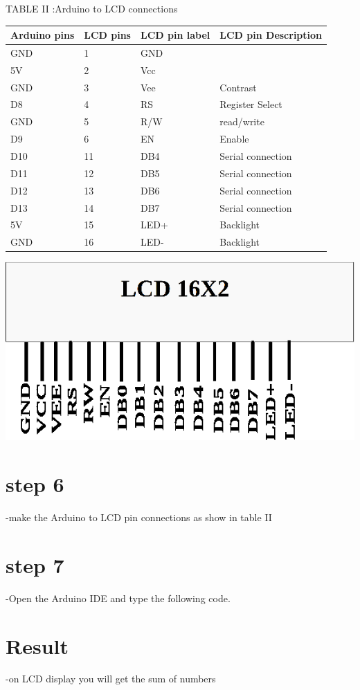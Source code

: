 \documentclass[twocolumn,13pt]{article}
\begin{document}
\begin{center}
    TABLE II :Arduino to LCD connections
\end{center}
 \begin{tabular}{ |p{1.5cm}|p{1.5cm}|p{1.5cm}|p{1.5cm}| }
 \hline
 \setlength{\tabcolsep}{3pt}
Arduino pins & LCD pins & LCD pin label & LCD pin Description\\
\hline
 GND & 1& GND & \\
 \hline
 5V & 2 & Vcc &\\
 \hline
 GND & 3 & Vee & Contrast\\
 \hline
 D8 & 4 & RS & Register Select\\
 \hline
 GND & 5 & R/W & read/write\\
 \hline
 D9 & 6 & EN &Enable\\
 \hline
 D10 & 11 & DB4 & Serial connection\\
 \hline
 D11 & 12 & DB5 & Serial connection\\
 \hline
 D12 & 13 & DB6 & Serial connection\\
 \hline
 D13 & 14 & DB7 & Serial connection\\
 \hline
 5V & 15 & LED+ & Backlight\\
 \hline
 GND & 16 & LED- & Backlight\\
 \hline
\end{tabular}



\includegraphics[scale=0.3]{../avr_gcc_assignment/figs/lcd.png} 




\section*{step 6}
-make the Arduino to LCD pin connections as show in  table II
\section*{step 7}
-Open the Arduino IDE and type the following code.

\section*{Result}
-on LCD display you will get the sum of numbers 
\end{document}
